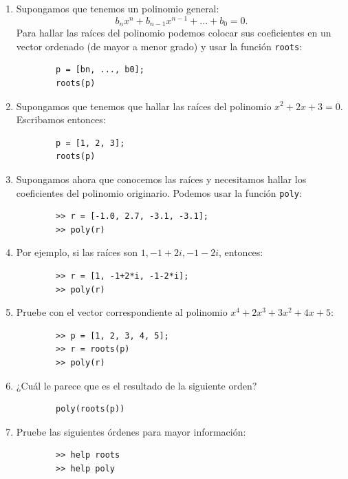 \begin{enumerate}
	\item Supongamos que tenemos un polinomio general:
	\begin{equation}
		b_{n}x^{n}+b_{n-1}x^{n-1}+...+b_{0}=0.
	\end{equation}
	Para hallar las raíces del polinomio podemos colocar sus coeficientes en un vector ordenado (de mayor a menor grado) y usar la función \texttt{roots}:
	\begin{verbatim}
		p = [bn, ..., b0];
		roots(p)
	\end{verbatim}
	
	\item Supongamos que tenemos que hallar las raíces del polinomio $x^{2}+2x+3=0$. Escribamos entonces:
	\begin{verbatim}
		p = [1, 2, 3];
		roots(p)
	\end{verbatim}
	
	\item Supongamos ahora que conocemos las raíces y necesitamos hallar los coeficientes del polinomio originario. Podemos usar la función \texttt{poly}:
	\begin{verbatim}
		>> r = [-1.0, 2.7, -3.1, -3.1];
		>> poly(r)
	\end{verbatim}
	
	\item Por ejemplo, si las raíces son $1, -1+2i, -1-2i$, entonces:
	\begin{verbatim}
		>> r = [1, -1+2*i, -1-2*i];
		>> poly(r)
	\end{verbatim}
	
	\item Pruebe con el vector correspondiente al polinomio $x^4+2x^3+3x^2+4x+5$:
	\begin{verbatim}
		>> p = [1, 2, 3, 4, 5]; 
		>> r = roots(p)
		>> poly(r)
	\end{verbatim}
	
	\item ¿Cuál le parece que es el resultado de la siguiente orden?
	\begin{verbatim}
		poly(roots(p))
	\end{verbatim}
	
	\item Pruebe las siguientes órdenes para mayor información:
	\begin{verbatim}
		>> help roots
		>> help poly
	\end{verbatim}
\end{enumerate}

